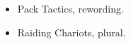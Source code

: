 

\subtitle{2.0.1}

\begin{itemize}
\item Pack Tactics, rewording.
\item Raiding Chariots, plural.
\end{itemize}

